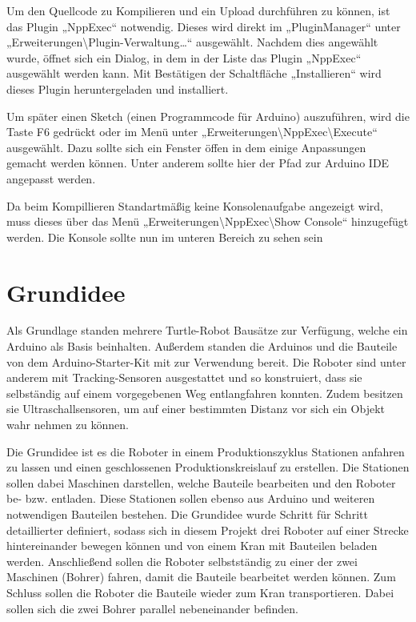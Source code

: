 Um den Quellcode zu Kompilieren und ein Upload durchführen zu können, ist das Plugin „NppExec“ notwendig. Dieses wird direkt im „PluginManager“ unter „Erweiterungen\textbackslash{}Plugin-Verwaltung…“ ausgewählt. Nachdem dies angewählt wurde, öffnet sich ein Dialog, in dem in der Liste das Plugin „NppExec“ ausgewählt werden kann. Mit Bestätigen der Schaltfläche „Installieren“ wird dieses Plugin heruntergeladen und installiert. 

Um später einen Sketch (einen Programmcode für Arduino) auszuführen, wird die Taste F6 gedrückt oder im Menü unter „Erweiterungen\textbackslash{}NppExec\textbackslash{}Execute“ ausgewählt. Dazu sollte sich ein Fenster öffen in dem einige Anpassungen gemacht werden können. Unter anderem sollte hier der Pfad zur Arduino IDE angepasst werden. 

Da beim Kompillieren Standartmäßig keine Konsolenaufgabe angezeigt wird, muss dieses über das Menü  „Erweiterungen\textbackslash{}NppExec\textbackslash{}Show Console“ hinzugefügt werden. Die Konsole sollte nun im unteren Bereich zu sehen sein

\section{Grundidee}

Als Grundlage standen mehrere Turtle-Robot Bausätze zur Verfügung, welche ein Arduino als Basis beinhalten. Außerdem
standen die Arduinos und die Bauteile von dem Arduino-Starter-Kit mit zur Verwendung bereit. Die Roboter
sind unter anderem mit Tracking-Sensoren ausgestattet und so konstruiert, dass sie selbständig
auf einem vorgegebenen Weg entlangfahren konnten. Zudem besitzen sie Ultraschallsensoren,
um auf einer bestimmten Distanz vor sich ein Objekt wahr nehmen zu können.


Die Grundidee ist es die Roboter in einem Produktionszyklus Stationen anfahren zu lassen und einen geschlossenen Produktionskreislauf zu erstellen.  Die Stationen sollen dabei Maschinen darstellen, welche Bauteile bearbeiten und den Roboter be- bzw. entladen. Diese Stationen sollen ebenso aus Arduino und weiteren notwendigen Bauteilen  bestehen. Die Grundidee wurde Schritt für Schritt detaillierter definiert, sodass sich in diesem Projekt drei Roboter auf einer Strecke hintereinander bewegen können und von einem Kran mit Bauteilen beladen werden. Anschließend sollen die Roboter selbstständig zu einer der zwei Maschinen (Bohrer) fahren, damit die Bauteile bearbeitet werden können. Zum Schluss sollen die Roboter die Bauteile wieder zum
Kran transportieren. Dabei sollen sich die zwei Bohrer parallel nebeneinander befinden. 

